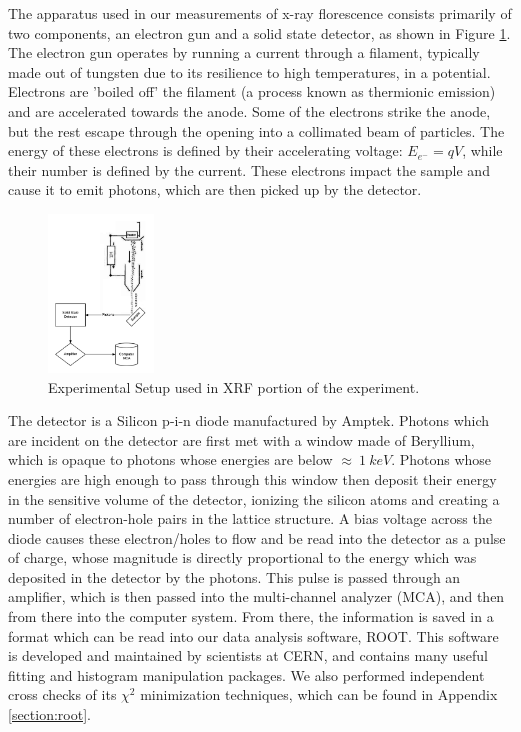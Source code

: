 \documentclass[%
 reprint,
 amsmath,amssymb,
 aps,
 pra,
]{revtex4-1}
\begin{document}
The apparatus used in our measurements of x-ray florescence consists primarily of two components, an electron gun and a solid state detector, as shown in Figure \ref{fig:xrf_setup}. The electron gun operates by running a current through a filament, typically made out of tungsten due to its resilience to high temperatures, in a potential. Electrons are 'boiled off' the filament (a process known as thermionic emission) and are accelerated towards the anode. Some of the electrons strike the anode, but the rest escape through the opening into a collimated beam of particles. The energy of these electrons is defined by their accelerating voltage: $E_{e^-} = qV$, while their number is defined by the current.  These electrons impact the sample and cause it to emit photons, which are then picked up by the detector. 

\begin{figure}[H]
	\centering
	\includegraphics[width=0.25\textwidth]{xrf_experiment.png}
	\caption{Experimental Setup used in XRF portion of the experiment.}
	\label{fig:xrf_setup}
\end{figure}

The detector is a Silicon p-i-n diode manufactured by Amptek. Photons which are incident on the detector are first met with a window made of Beryllium, which is opaque to photons whose energies are below $\approx ~1~keV$. Photons whose energies are high enough to pass through this window then deposit their energy in the sensitive volume of the detector, ionizing the silicon atoms and creating a number of electron-hole pairs in the lattice structure. A bias voltage across the diode causes these electron/holes to flow and be read into the detector as a pulse of charge, whose magnitude is directly proportional to the energy which was deposited in the detector by the photons. This pulse is passed through an amplifier, which is then passed into the multi-channel analyzer (MCA), and then from there into the computer system. From there, the information is saved in a format which can be read into our data analysis software, ROOT. This software is developed and maintained by scientists at CERN, and contains many useful fitting and histogram manipulation packages. We also performed independent cross checks of its $\chi^2$ minimization techniques, which can be found in Appendix \ref{section:root}.
\end{document}
